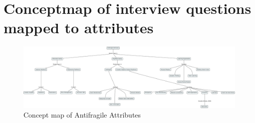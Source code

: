 \appendix
\chapter{Conceptmap of interview questions mapped to attributes}
\label{app:cmapinterviewattributes}

\begin{figure}
	\centering
	\includegraphics[width=0.9\linewidth]{images/cmapafattributes}
	\caption{Concept map of Antifragile Attributes}
	\label{fig:conceptmapafattributes}
\end{figure}